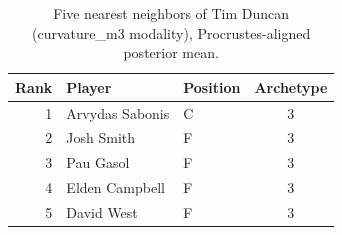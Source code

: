 \begin{table}[htbp]
  \centering\small
  \begin{tabular}{rllc}
    \toprule
    Rank & Player & Position & Archetype \\
    \midrule
    1 & Arvydas Sabonis & C & 3 \\
    2 & Josh Smith & F & 3 \\
    3 & Pau Gasol & F & 3 \\
    4 & Elden Campbell & F & 3 \\
    5 & David West & F & 3 \\
    \bottomrule
  \end{tabular}
  \caption{Five nearest neighbors of Tim Duncan (curvature_m3 modality), Procrustes-aligned posterior mean.}
  \label{tab:Tim_Duncan_neighbors_curvature_m3}
\end{table}

